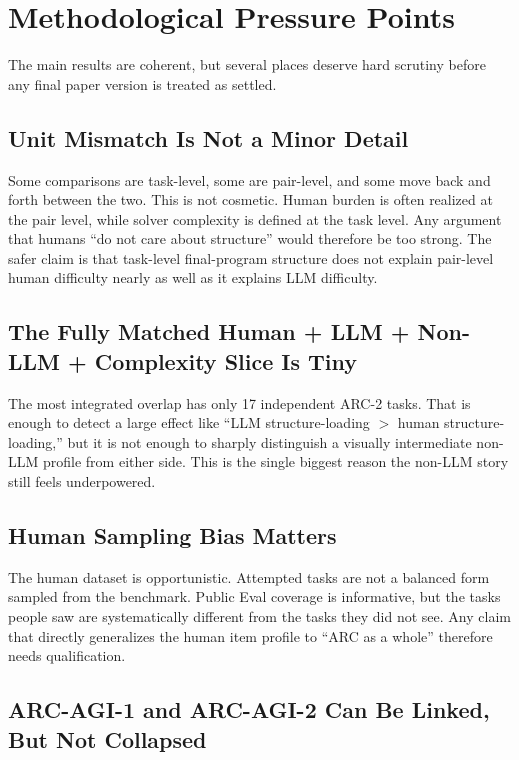 \documentclass[11pt,letterpaper]{article}
\begin{document}
\section{Methodological Pressure Points}

The main results are coherent, but several places deserve hard scrutiny before any final paper version is treated as settled.

\subsection{Unit Mismatch Is Not a Minor Detail}

Some comparisons are task-level, some are pair-level, and some move back and forth between the two. This is not cosmetic. Human burden is often realized at the pair level, while solver complexity is defined at the task level. Any argument that humans ``do not care about structure'' would therefore be too strong. The safer claim is that task-level final-program structure does not explain pair-level human difficulty nearly as well as it explains LLM difficulty.

\subsection{The Fully Matched Human + LLM + Non-LLM + Complexity Slice Is Tiny}

The most integrated overlap has only 17 independent ARC-2 tasks. That is enough to detect a large effect like ``LLM structure-loading $>$ human structure-loading,'' but it is not enough to sharply distinguish a visually intermediate non-LLM profile from either side. This is the single biggest reason the non-LLM story still feels underpowered.

\subsection{Human Sampling Bias Matters}

The human dataset is opportunistic. Attempted tasks are not a balanced form sampled from the benchmark. Public Eval coverage is informative, but the tasks people saw are systematically different from the tasks they did not see. Any claim that directly generalizes the human item profile to ``ARC as a whole'' therefore needs qualification.

\subsection{ARC-AGI-1 and ARC-AGI-2 Can Be Linked, But Not Collapsed}
\end{document}
